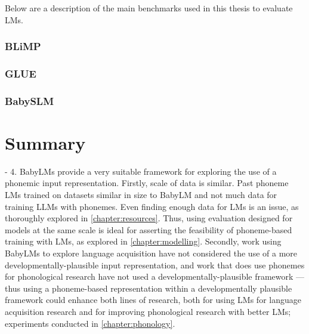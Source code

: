 Below are a description of the main benchmarks used in this thesis to evaluate LMs. 

\subsubsection{BLiMP}\label{sec:12-blimp}

\subsubsection{GLUE}

\subsubsection{BabySLM}

\section{Summary}


- 4. BabyLMs provide a very suitable framework for exploring the use of a phonemic input representation. Firstly, scale of data is similar. Past phoneme LMs trained on datasets similar in size to BabyLM and not much data for training LLMs with phonemes. Even finding enough data for LMs is an issue, as thoroughly explored in \cref{chapter:resources}. Thus, using evaluation designed for models at the same scale is ideal for asserting the feasibility of phoneme-based training with LMs, as explored in \cref{chapter:modelling}. Secondly, work using BabyLMs to explore language acquisition have not considered the use of a more developmentally-plausible input representation, and work that does use phonemes for phonological research have not used a developmentally-plausible framework --- thus using a phoneme-based representation within a developmentally plausible framework could enhance both lines of research, both for using LMs for language acquisition research and for improving phonological research with better LMs; experiments conducted in \cref{chapter:phonology}.